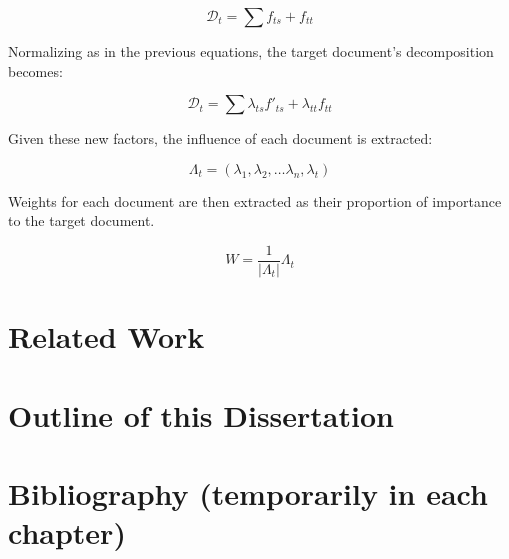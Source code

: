 \documentclass[../dissertation.tex]{subfiles}
\begin{document}
\begin{equation} \label{eq:influence_factors}
  \mathcal{D}_t = \sum f_{ts} + f_{tt}
\end{equation}

Normalizing as in the previous equations, the target
document's decomposition becomes:

\begin{equation} \label{eq:influence_factors_normalized}
  \mathcal{D}_t = \sum \lambda_{ts} f'_{ts} + \lambda_{tt} f_{tt}
\end{equation}

Given these new factors, the influence of each document is extracted:

\begin{equation} \label{eq:document_lambda}
  \Lambda_t = (\lambda_1, \lambda_2, \ldots \lambda_n, \lambda_t)
\end{equation}

Weights for each document are then extracted as their proportion of
importance to the target document.

\begin{equation} \label{eq:document_weights}
  W = \displaystyle\frac{1}{|\Lambda_t|} \Lambda_t
\end{equation}

\section{Related Work}

\section{Outline of this Dissertation}

\section{Bibliography (temporarily in each chapter)}


\end{document}
